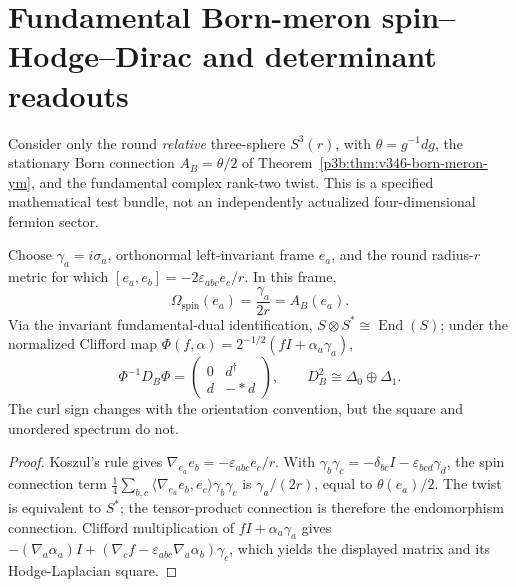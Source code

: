 \documentclass[12pt,a4paper]{article}
\begin{document}
\section{Fundamental Born-meron spin--Hodge--Dirac and determinant readouts}
\label{p3b:sec:v349-born-meron-hodge-determinant}
Consider only the round \emph{relative} three-sphere $S^3(r)$,
with $\theta=g^{-1}dg$, the stationary Born connection
$A_B=\theta/2$ of Theorem~\ref{p3b:thm:v346-born-meron-ym},
and the fundamental complex rank-two twist.  This is a
specified mathematical test bundle, not an independently
actualized four-dimensional fermion sector.

\begin{theorem}
\label{p3b:thm:v349-meron-spin-hodge}
Choose $\gamma_a=i\sigma_a$, orthonormal left-invariant frame
$e_a$, and the round radius-$r$ metric for which
$[e_a,e_b]=-2\varepsilon_{abc}e_c/r$.  In this frame,
\[
 \Omega_{\mathrm{spin}}(e_a)=\frac{\gamma_a}{2r}
 =A_B(e_a).
\]
Via the invariant fundamental-dual identification,
$S\otimes S^*\cong\operatorname{End}(S)$; under the normalized
Clifford map $\Phi(f,\alpha)=2^{-1/2}(fI+\alpha_a\gamma_a)$,
\[
 \Phi^{-1}D_B\Phi=
 \begin{pmatrix}0&d^\dagger\\d&-*d\end{pmatrix},
 \qquad D_B^2\cong\Delta_0\oplus\Delta_1.
\]
The curl sign changes with the orientation convention, but the
square and unordered spectrum do not.
\end{theorem}
\begin{proof}
Koszul's rule gives $\nabla_{e_a}e_b=-\varepsilon_{abc}e_c/r$.
With $\gamma_b\gamma_c=-\delta_{bc}I-\varepsilon_{bcd}\gamma_d$,
the spin connection term
$\frac14\sum_{b,c}\langle\nabla_{e_a}e_b,e_c\rangle\gamma_b\gamma_c$
is $\gamma_a/(2r)$, equal to $\theta(e_a)/2$.
The twist is equivalent to $S^*$; the tensor-product
connection is therefore the endomorphism connection.
Clifford multiplication of $fI+\alpha_a\gamma_a$ gives
$-(\nabla_a\alpha_a)I+
(\nabla_cf-\varepsilon_{abc}\nabla_a\alpha_b)\gamma_c$,
which yields the displayed matrix and its Hodge-Laplacian square.
\end{proof}
\end{document}

